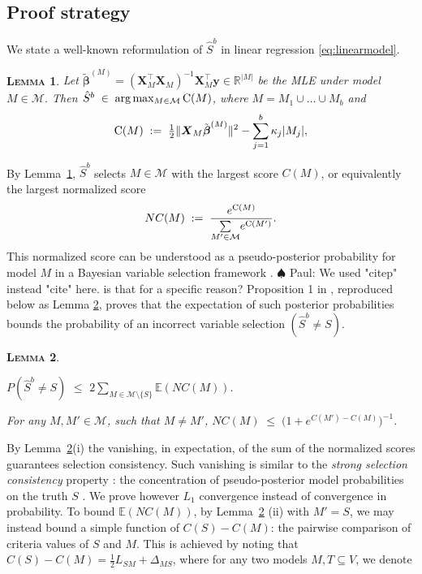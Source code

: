 \documentclass[aos]{imsart}
\theoremstyle{plain}
\newtheorem{lem}{\textsc{Lemma}}[section]
\newcommand{\paul}[1]{{\small{\color{green} \sf $\spadesuit$ Paul: #1}}}
\newcommand{\E}{\mathbb{E}}
\newcommand{\R}{\mathbb{R}}
\newcommand{\bs}{\boldsymbol}
\begin{document}
\subsection{Proof strategy}
\label{ssec:regression_proof_strategy}


We state a well-known
reformulation of $\hat S^b$ in linear regression \eqref{eq:linearmodel}. 
\begin{lem}\label{lem:useful-reformulation} Let $\tilde{\bs \beta}^{(M)}= (\bs X_{\!\!M}^\top \bs X_{\!\!M})^{-1}\bs X_{\!\!M}^\top\bs y \in \R^{|M|}$ be the MLE under model $M\in \mathcal{M}$. Then $\hat S^b\;\in\;\arg\max_{M\in \mathcal{M}} {\rm C}(M)$, where $M=M_1\cup \ldots\cup M_b$ and
\begin{equation}\label{eq:CM}
    {\rm C}(M)\;: =\;\tfrac{1}{2}\|\bs X_M\tilde{\bs\beta}^{(M)}\|^2-\sum_{j=1}^b\kappa_j |M_j|,
\end{equation}
\end{lem}
By Lemma~\ref{lem:useful-reformulation}, $\hat S^b$ selects %
$M\in \mathcal{M}$ with the largest score $C(M)$, or equivalently the largest normalized score
\begin{equation}\label{eq:normalizedscore}
    NC(M)\;:=\;\frac{e^{{\rm C}(M)}}{\underset{M' \in \mathcal{M}}{\sum} e^{{\rm C}(M')}}.
\end{equation}
This normalized score can be understood as a pseudo-posterior probability for model $M$ in a Bayesian variable selection framework \citep{BIC}. \paul{We used "citep" instead "cite" here. is that for a specific reason?}
Proposition 1 in \cite{rossell2022concentration}, reproduced below as Lemma \ref{lem:L0toL1convergence}, proves that the expectation of such posterior probabilities bounds the probability of an incorrect variable selection $(\hat S^b\neq S)$. 

\begin{lem}\label{lem:L0toL1convergence}
\begin{longlist}
\item 
$P(\hat{S}^{b} \neq S) \,\,\leq \,\, 2 \sum_{M \in \mathcal{M}\setminus \{S\}} \E\left(NC(M)\right).$
\item  For any $M,M'\in\mathcal{M}$, such that $M\neq M'$, 
$NC(M)\;\leq \;\big(1+e^{C(M')-C(M)}\big)^{-1}$.
\end{longlist}
\end{lem}
By Lemma~\ref{lem:L0toL1convergence}(i) the vanishing, in expectation, of the sum of the normalized scores 
guarantees selection consistency. Such vanishing is similar to the \textit{strong selection consistency} property \citep{narisettyhe2014}: the concentration of pseudo-posterior model probabilities on the truth $S$ . We prove however $L_1$ convergence instead of convergence in probability.
To bound $\E(NC(M))$, by Lemma~\ref{lem:L0toL1convergence} (ii) with $M'=S$, we may instead bound a simple function of $C(S)-C(M)$: the pairwise comparison of criteria values of $S$ and $M$. 
This is achieved by noting that $C(S)-C(M)=\tfrac12 L_{SM}+\Delta_{MS}$, where for any two models $M,T\subseteq V$, we denote
\end{document}
